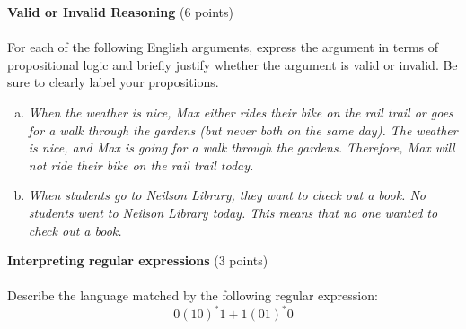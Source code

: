 \documentclass[12pt]{article}
\newenvironment{question}[2][Question]{\begin{trivlist}
\item[\hskip \labelsep {\bfseries #1}\hskip \labelsep {\bfseries #2.}]}{\end{trivlist}}
\begin{document}
%
\clearpage
\begin{question}{1}\textbf{Valid or Invalid Reasoning} (6 points)\\\\
For each of the following English arguments, express the argument in terms of
propositional logic and briefly justify whether the argument is valid or invalid. Be sure to clearly label your propositions.
\begin{enumerate}[(a)]	
	\item \textit{When the weather is nice, Max either rides their bike on the rail trail or goes for a walk through the gardens (but never both on the same day). The weather is nice, and Max is going for a walk through the gardens. Therefore, Max will not ride their bike on the rail trail today.}\vspace{16em}
	\item \textit{When students go to Neilson Library, they want to check out a book. No students went to Neilson Library today. This means that no one wanted to check out a book.}
\end{enumerate}
\end{question}

\clearpage
\begin{question}{2}\textbf{Interpreting regular expressions} (3 points)\\\\
Describe the language matched by the following regular expression:
\[0(10)^*1+1(01)^*0\]
\end{question}
\vspace{16em}
\end{document}
